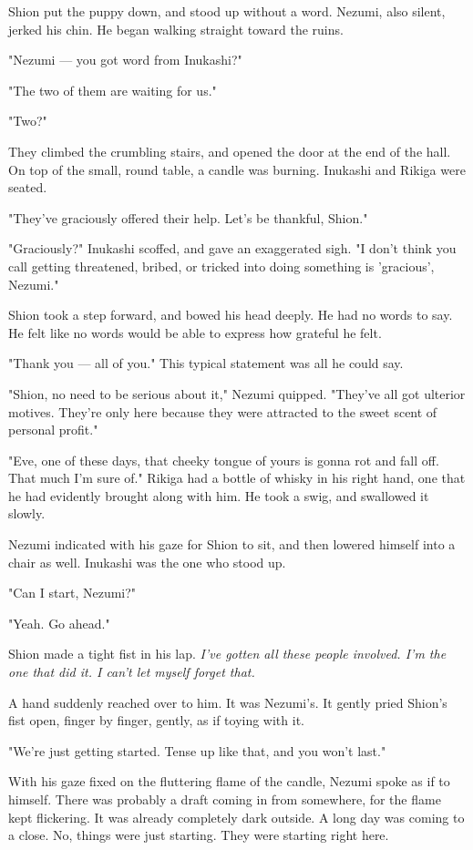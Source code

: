 Shion put the puppy down, and stood up without a word. Nezumi, also
silent, jerked his chin. He began walking straight toward the ruins.

"Nezumi --- you got word from Inukashi?"

"The two of them are waiting for us."

"Two?"

They climbed the crumbling stairs, and opened the door at the end of the
hall. On top of the small, round table, a candle was burning. Inukashi
and Rikiga were seated.

"They've graciously offered their help. Let's be thankful, Shion."

"Graciously?" Inukashi scoffed, and gave an exaggerated sigh. "I don't
think you call getting threatened, bribed, or tricked into doing
something is 'gracious', Nezumi."

Shion took a step forward, and bowed his head deeply. He had no words to
say. He felt like no words would be able to express how grateful he
felt.

"Thank you --- all of you." This typical statement was all he could say.

"Shion, no need to be serious about it," Nezumi quipped. "They've all
got ulterior motives. They're only here because they were attracted to
the sweet scent of personal profit."

"Eve, one of these days, that cheeky tongue of yours is gonna rot and
fall off. That much I'm sure of." Rikiga had a bottle of whisky in his
right hand, one that he had evidently brought along with him. He took a
swig, and swallowed it slowly.

Nezumi indicated with his gaze for Shion to sit, and then lowered
himself into a chair as well. Inukashi was the one who stood up.

"Can I start, Nezumi?"

"Yeah. Go ahead."

Shion made a tight fist in his lap. \emph{I've gotten all these people
involved. I'm the one that did it. I can't let myself forget that.}

A hand suddenly reached over to him. It was Nezumi's. It gently pried
Shion's fist open, finger by finger, gently, as if toying with it.

"We're just getting started. Tense up like that, and you won't last."

With his gaze fixed on the fluttering flame of the candle, Nezumi spoke
as if to himself. There was probably a draft coming in from somewhere,
for the flame kept flickering. It was already completely dark outside. A
long day was coming to a close. No, things were just starting. They were
starting right here.

